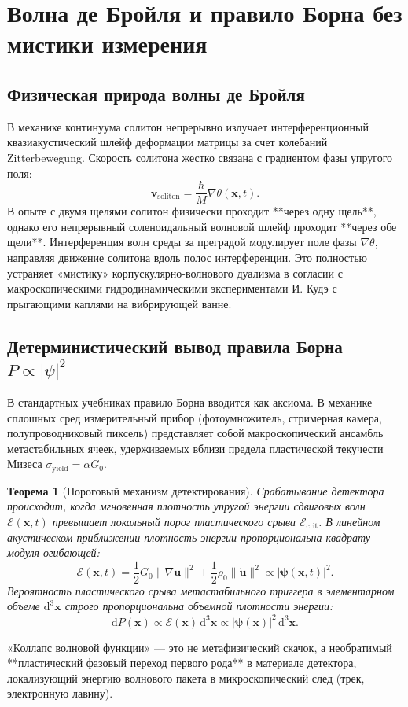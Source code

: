 \documentclass[11pt,a4paper]{article}
\newtheorem{theorem}{Теорема}
\theoremstyle{definition}
\theoremstyle{remark}
\begin{document}
\section{Волна де Бройля и правило Борна без мистики измерения}
\subsection{Физическая природа волны де Бройля}
В механике континуума солитон непрерывно излучает интерференционный квазиакустический шлейф деформации матрицы за счет колебаний Zitterbewegung. Скорость солитона жестко связана с градиентом фазы упругого поля:
\begin{equation}
    \mathbf{v}_{\mathrm{soliton}} = \frac{\hbar}{M} \nabla \theta(\mathbf{x}, t).
\end{equation}
В опыте с двумя щелями солитон физически проходит **через одну щель**, однако его непрерывный соленоидальный волновой шлейф проходит **через обе щели**. Интерференция волн среды за преградой модулирует поле фазы $\nabla\theta$, направляя движение солитона вдоль полос интерференции. Это полностью устраняет «мистику» корпускулярно-волнового дуализма в согласии с макроскопическими гидродинамическими экспериментами И. Кудэ с прыгающими каплями на вибрирующей ванне.

\subsection{Детерминистический вывод правила Борна $P \propto |\psi|^2$}
В стандартных учебниках правило Борна вводится как аксиома. В механике сплошных сред измерительный прибор (фотоумножитель, стримерная камера, полупроводниковый пиксель) представляет собой макроскопический ансамбль метастабильных ячеек, удерживаемых вблизи предела пластической текучести Мизеса $\sigma_{\mathrm{yield}} = \alpha G_0$.

\begin{theorem}[Пороговый механизм детектирования]
Срабатывание детектора происходит, когда мгновенная плотность упругой энергии сдвиговых волн $\mathcal{E}(\mathbf{x}, t)$ превышает локальный порог пластического срыва $\mathcal{E}_{\mathrm{crit}}$. В линейном акустическом приближении плотность энергии пропорциональна квадрату модуля огибающей:
\begin{equation}
    \mathcal{E}(\mathbf{x}, t) = \frac{1}{2} G_0 \|\nabla \mathbf{u}\|^2 + \frac{1}{2} \rho_0 \|\dot{\mathbf{u}}\|^2 \propto |\boldsymbol{\psi}(\mathbf{x}, t)|^2.
\end{equation}
Вероятность пластического срыва метастабильного триггера в элементарном объеме $\mathrm{d}^3\mathbf{x}$ строго пропорциональна объемной плотности энергии:
\begin{equation}
    \mathrm{d}P(\mathbf{x}) \propto \mathcal{E}(\mathbf{x}) \, \mathrm{d}^3\mathbf{x} \propto |\boldsymbol{\psi}(\mathbf{x})|^2 \, \mathrm{d}^3\mathbf{x}.
\end{equation}
\end{theorem}
«Коллапс волновой функции» — это не метафизический скачок, а необратимый **пластический фазовый переход первого рода** в материале детектора, локализующий энергию волнового пакета в микроскопический след (трек, электронную лавину).
\end{document}
